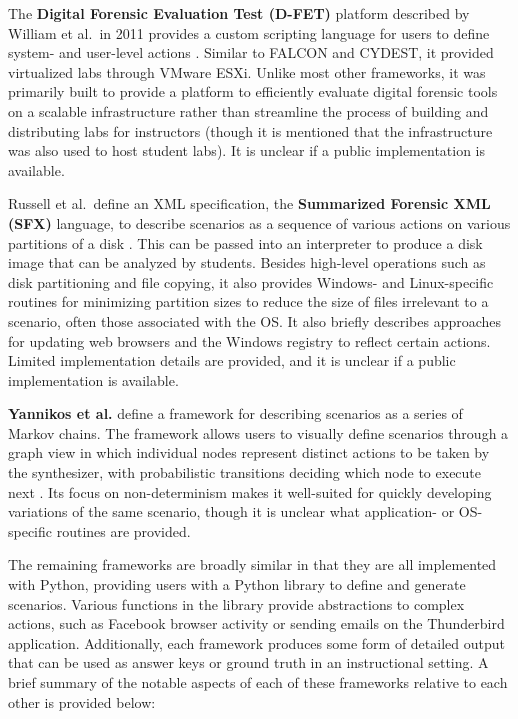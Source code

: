 \documentclass[letterpaper,12pt]{report}
\begin{document}
The \textbf{Digital Forensic Evaluation Test (D-FET)} platform described
by William et al.~in 2011 provides a custom scripting language for users
to define system- and user-level actions
\cite{williamCloudbasedDigitalForensics2011}. Similar to FALCON and
CYDEST, it provided virtualized labs through VMware ESXi. Unlike most
other frameworks, it was primarily built to provide a platform to
efficiently evaluate digital forensic tools on a scalable infrastructure
rather than streamline the process of building and distributing labs for
instructors (though it is mentioned that the infrastructure was also
used to host student labs). It is unclear if a public implementation is
available.

Russell et al.~define an XML specification, the \textbf{Summarized
Forensic XML (SFX)} language, to describe scenarios as a sequence of
various actions on various partitions of a disk
\cite{russellForensicImageDescription2012}. This can be passed into
an interpreter to produce a disk image that can be analyzed by students.
Besides high-level operations such as disk partitioning and file
copying, it also provides Windows- and Linux-specific routines for
minimizing partition sizes to reduce the size of files irrelevant to a
scenario, often those associated with the OS. It also briefly describes
approaches for updating web browsers and the Windows registry to reflect
certain actions. Limited implementation details are provided, and it is
unclear if a public implementation is available.

\textbf{Yannikos et al.} define a framework for describing scenarios as
a series of Markov chains. The framework allows users to visually define
scenarios through a graph view in which individual nodes represent
distinct actions to be taken by the synthesizer, with probabilistic
transitions deciding which node to execute next
\cite{yannikosDataCorporaDigital2014}. Its focus on non-determinism
makes it well-suited for quickly developing variations of the same
scenario, though it is unclear what application- or OS-specific routines
are provided.

The remaining frameworks are broadly similar in that they are all
implemented with Python, providing users with a Python library to define
and generate scenarios. Various functions in the library provide
abstractions to complex actions, such as Facebook browser activity or
sending emails on the Thunderbird application. Additionally, each
framework produces some form of detailed output that can be used as
answer keys or ground truth in an instructional setting. A brief summary
of the notable aspects of each of these frameworks relative to each
other is provided below:
\end{document}
